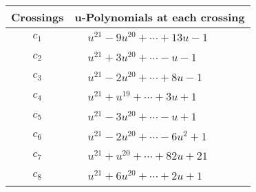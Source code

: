 \documentclass[1p]{elsarticle_modified}
\theoremstyle{definition}
\begin{document}
\begin{tabular}{m{50pt}|m{274pt}}
Crossings & \hspace{64pt}u-Polynomials at each crossing \\
\hline $$\begin{aligned}c_{1}\end{aligned}$$&$\begin{aligned}
&u^{21}-9 u^{20}+\cdots+13 u-1
\end{aligned}$\\
\hline $$\begin{aligned}c_{2}\end{aligned}$$&$\begin{aligned}
&u^{21}+3 u^{20}+\cdots- u-1
\end{aligned}$\\
\hline $$\begin{aligned}c_{3}\end{aligned}$$&$\begin{aligned}
&u^{21}-2 u^{20}+\cdots+8 u-1
\end{aligned}$\\
\hline $$\begin{aligned}c_{4}\end{aligned}$$&$\begin{aligned}
&u^{21}+u^{19}+\cdots+3 u+1
\end{aligned}$\\
\hline $$\begin{aligned}c_{5}\end{aligned}$$&$\begin{aligned}
&u^{21}-3 u^{20}+\cdots- u+1
\end{aligned}$\\
\hline $$\begin{aligned}c_{6}\end{aligned}$$&$\begin{aligned}
&u^{21}-2 u^{20}+\cdots-6 u^2+1
\end{aligned}$\\
\hline $$\begin{aligned}c_{7}\end{aligned}$$&$\begin{aligned}
&u^{21}+u^{20}+\cdots+82 u+21
\end{aligned}$\\
\hline $$\begin{aligned}c_{8}\end{aligned}$$&$\begin{aligned}
&u^{21}+6 u^{20}+\cdots+2 u+1
\end{aligned}$\\

\end{tabular}
\end{document}
